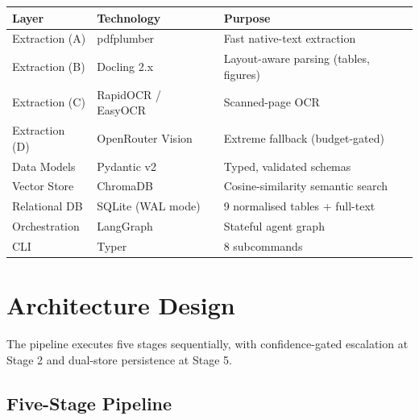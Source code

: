 \documentclass[12pt,a4paper]{article}
\begin{document}
\begin{center}
\begin{tabular}{lll}
\toprule
\textbf{Layer} & \textbf{Technology} & \textbf{Purpose} \\
\midrule
Extraction (A) & pdfplumber          & Fast native-text extraction \\
Extraction (B) & Docling 2.x         & Layout-aware parsing (tables, figures) \\
Extraction (C) & RapidOCR / EasyOCR  & Scanned-page OCR \\
Extraction (D) & OpenRouter Vision   & Extreme fallback (budget-gated) \\
Data Models    & Pydantic v2         & Typed, validated schemas \\
Vector Store   & ChromaDB            & Cosine-similarity semantic search \\
Relational DB  & SQLite (WAL mode)   & 9 normalised tables + full-text \\
Orchestration  & LangGraph           & Stateful agent graph \\
CLI            & Typer               & 8 subcommands \\
\bottomrule
\end{tabular}
\end{center}


\section{Architecture Design}

The pipeline executes five stages sequentially, with confidence-gated
escalation at Stage 2 and dual-store persistence at Stage 5.

\subsection{Five-Stage Pipeline}
\end{document}
